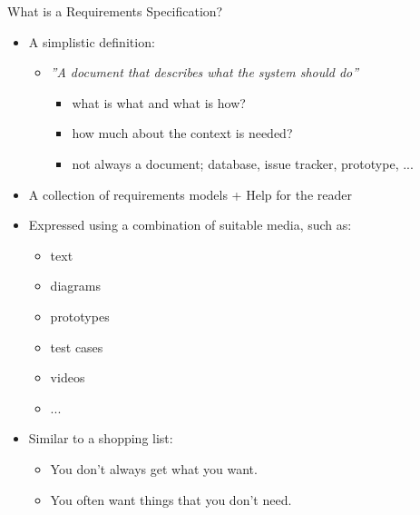


\begin{Slide}{What is a Requirements Specification?}

\begin{itemize}
\item A simplistic definition:  
\begin{itemize}
\item \textit{''A document that describes what the system should do''}
\begin{itemize}
\item what is what and what is how?
\item how much about the context is needed?
\item not always a document; database, issue tracker, prototype, ...

\end{itemize}
\end{itemize}
\item A collection of requirements models + Help for the reader

\item Expressed using a combination of suitable media, such as:
\begin{itemize}
\item text
\item diagrams
\item prototypes
\item test cases
\item videos
\item ...

\end{itemize}
\item Similar to a shopping list:
\begin{itemize}
\item You don't always get what you want.
\item You often want things that you don't need.

\end{itemize}
\end{itemize}
\end{Slide}